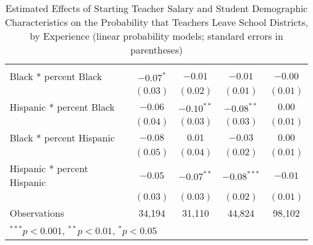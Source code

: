 \documentclass[]{article}
\begin{document}
\begin{table}
\begin{center}
\begin{tabular}{l c c c c }
                                            &             &              &               &               \\
\quad Black * percent Black                 & $-0.07^{*}$ & $-0.01$      & $-0.01$       & $-0.00$       \\
                                            & $(0.03)$    & $(0.02)$     & $(0.01)$      & $(0.01)$      \\
\quad Hispanic * percent Black              & $-0.06$     & $-0.10^{**}$ & $-0.08^{**}$  & $0.00$        \\
                                            & $(0.04)$    & $(0.03)$     & $(0.03)$      & $(0.01)$      \\
\quad Black * percent Hispanic              & $-0.08$     & $0.01$       & $-0.03$       & $0.00$        \\
                                            & $(0.05)$    & $(0.04)$     & $(0.02)$      & $(0.01)$      \\
\quad Hispanic * percent Hispanic           & $-0.05$     & $-0.07^{**}$ & $-0.08^{***}$ & $-0.01$       \\
                                            & $(0.03)$    & $(0.03)$     & $(0.02)$      & $(0.01)$      \\
\hline
Observations                                & 34,194       & 31,110        & 44,824         & 98,102         \\
\hline
\multicolumn{5}{l}{\scriptsize{$^{***}p<0.001$, $^{**}p<0.01$, $^*p<0.05$}}
\end{tabular}
\caption{Estimated Effects of Starting Teacher Salary and Student Demographic Characteristics on the Probability that Teachers Leave School Districts, by Experience (linear probability models; standard errors in parentheses)}
\label{tbl:reg_lpm}
\end{center}
\end{table}
\end{document}
